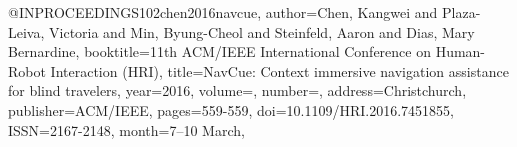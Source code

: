 @INPROCEEDINGS{102chen2016navcue,
author={Chen, Kangwei and Plaza-Leiva, Victoria and Min, Byung-Cheol and Steinfeld, Aaron and Dias, Mary Bernardine},
booktitle={11th ACM/IEEE International Conference on Human-Robot Interaction (HRI)}, 
title={NavCue: Context immersive navigation assistance for blind travelers}, 
year={2016},
volume={},
number={},
address={Christchurch},
publisher={ACM/IEEE},
pages={559-559},
doi={10.1109/HRI.2016.7451855},
ISSN={2167-2148},
month={7--10 March},}